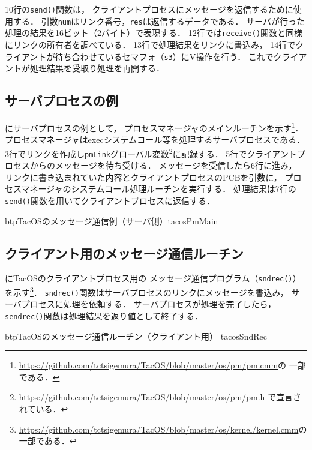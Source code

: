 10行の{\tt send()}関数は，
クライアントプロセスにメッセージを返信するために使用する．
引数{\tt num}はリンク番号，{\tt res}は返信するデータである．
サーバが行った処理の結果を16ビット（2バイト）で表現する．
12行では{\tt receive()}関数と同様にリンクの所有者を調べている．
13行で処理結果をリンクに書込み，
14行でクライアントが待ち合わせているセマフォ（{\tt s3}）にV操作を行う．
これでクライアントが処理結果を受取り処理を再開する．

\subsection{サーバプロセスの例}
にサーバプロセスの例として，
プロセスマネージャのメインルーチンを示す\footnote{
\url{https://github.com/tctsigemura/TacOS/blob/master/os/pm/pm.cmm}の
一部である．}．
プロセスマネージャはexecシステムコール等を処理するサーバプロセスである．
3行でリンクを作成し{\tt pmLink}グローバル変数\footnote{
\url{https://github.com/tctsigemura/TacOS/blob/master/os/pm/pm.h}
で宣言されている．}に記録する．
5行でクライアントプロセスからのメッセージを待ち受ける．
メッセージを受信したら6行に進み，
リンクに書き込まれていた内容とクライアントプロセスのPCBを引数に，
プロセスマネージャのシステムコール処理ルーチンを実行する．
処理結果は7行の{\tt send()}関数を用いてクライアントプロセスに返信する．

\begin{myfig}{btp}{TacOSのメッセージ通信例（サーバ側）}{tacosPmMain}

\end{myfig}

\subsection{クライアント用のメッセージ通信ルーチン}
にTacOSのクライアントプロセス用の
メッセージ通信プログラム（{\tt sndrec()}）を示す\footnote{
\url{https://github.com/tctsigemura/TacOS/blob/master/os/kernel/kernel.cmm}の
一部である．}．
{\tt sndrec()}関数はサーバプロセスのリンクにメッセージを書込み，
サーバプロセスに処理を依頼する．
サーバプロセスが処理を完了したら，
{\tt sendrec()}関数は処理結果を返り値として終了する．

\begin{myfig}{btp}{TacOSのメッセージ通信ルーチン（クライアント用）}
{tacosSndRec}

\end{myfig}

